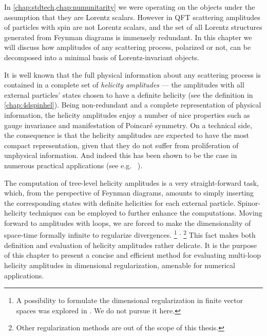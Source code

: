 \newcommand\helampl{\mathcal{A}_{\vb*{\lambda}}}

In \cref{chap:stdtech,chap:numunitarity} we were operating on the objects under the assumption that they are Lorentz scalars.
However in QFT scattering amplitudes of particles with spin are not Lorentz scalars,
and the set of all Lorentz structures generated from Feynman diagrams is immensely redundant.
In this chapter we will discuss how amplitudes of any scattering process, 
polarized or not, can be decomposed into a minimal basis of Lorentz-invariant objects.

It is well known that the full physical information about any scattering process is contained in a complete set of \textit{helicity amplitudes} ---
the amplitudes with all external particles' states chosen to have a definite helicity (see the definition in \cref{chap:4dspinhel}).
Being non-redundant and a complete representation of physical information, the helicity amplitudes 
enjoy a number of nice properties such as gauge invariance and manifestation of Poincaré symmetry.
On a technical side, the consequence is that the helicity amplitudes are expected to have the most compact representation,
given that they do not suffer from proliferation of unphysical information.
And indeed this has been shown to be the case in numerous practical applications (see e.g.\ %
\cite{DeLaurentis:2019phz,Badger:2019djh,Badger:2011yu,Badger:2013gxa,DeFreitas:2004kmi,Gehrmann:2011aa,Gehrmann:2009vu,Glover:2004si,Glover:2003cm,Garland:2002ak,Dunbar:2016aux,Dunbar:2016gjb,Dunbar:2016cxp,Badger:2015lda,Gehrmann:2015bfy,Bern:2003ck,Bern:2002tk,Badger:2018enw,Dunbar2017,Kunszt:1994nq}).

The computation of tree-level helicity amplitudes is a very straight-forward task,
which, from the perspective of Feynman diagrams,
amounts to simply inserting the corresponding states with definite helicities for each external particle.
Spinor-helicity techniques can be employed to further enhance the computations.
Moving forward to amplitudes with loops,
we are forced to make the dimensionality of space-time formally infinite \cite{Collins:1984xc} 
to regularize divergences.%
\footnote{
  A possibility to formulate the dimensional regularization in finite vector spaces was explored in \cite{Weinzierl:1999xb}.
  We do not pursue it here.
}%
\textsuperscript{,}%
\footnote{
  Other regularization methods are out of the scope of this thesis.
}
This fact makes both definition and evaluation of helicity amplitudes rather delicate.
It is the purpose of this chapter to present a concise and efficient method for
evaluating multi-loop helicity amplitudes in dimensional regularization,
amenable for numerical applications.

